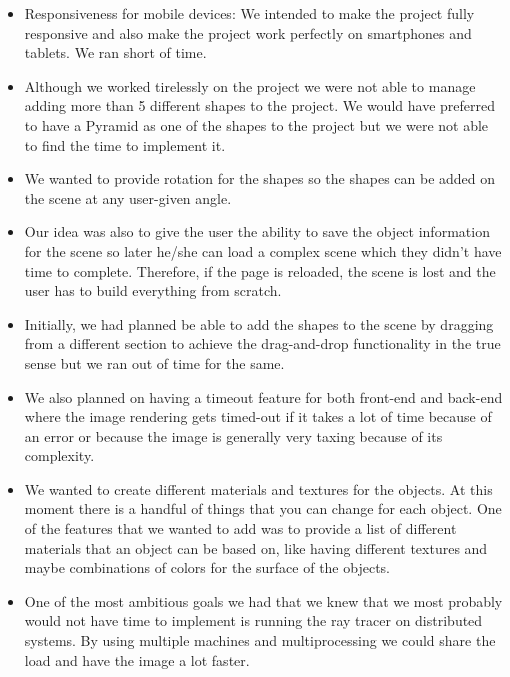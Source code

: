 \documentclass[10pt]{scrartcl}
\begin{document}
\begin{itemize}
    \item Responsiveness for mobile devices: We intended to make the project fully responsive and also make the project work perfectly on smartphones and tablets. We ran short of time.
    \item Although we worked tirelessly on the project we were not able to manage adding more than 5 different shapes to the project. We would have preferred to have a Pyramid as one of the shapes to the project but we were not able to find the time to implement it.
    \item We wanted to provide rotation for the shapes so the shapes can be added on the scene at any user-given angle. 
    \item Our idea was also to give the user the ability to save the object information for the scene so later he/she can load a complex scene which they didn't have time to complete. Therefore, if the page is reloaded, the scene is lost and the user has to build everything from scratch.
    \item Initially, we had planned be able to add the shapes to the scene by dragging from a different section to achieve the drag-and-drop functionality in the true sense but we ran out of time for the same.
    \item We also planned on having a timeout feature for both front-end and back-end where the image rendering gets timed-out if it takes a lot of time because of an error or because the image is generally very taxing because of its complexity. 
    \item We wanted to create different materials and textures for the objects. At this moment there is a handful of things that you can change for each object. One of the features that we wanted to add was to provide a list of different materials that an object can be based on, like having different textures and maybe combinations of colors for the surface of the objects.
    \item One of the most ambitious goals we had that we knew that we most probably would not have time to implement is running the ray tracer on distributed systems. By using multiple machines and multiprocessing we could share the load and have the image a lot faster.
\end{itemize}
\end{document}
